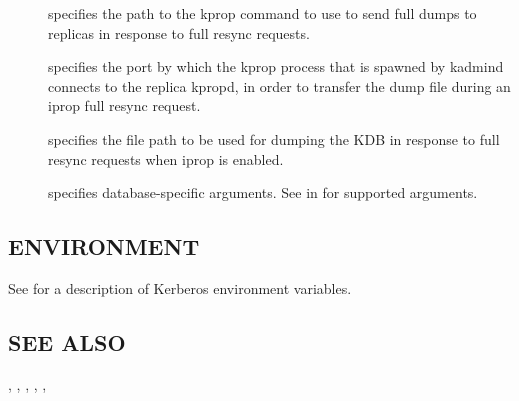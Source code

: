 \documentclass[letterpaper,10pt,english]{sphinxmanual}
\begin{document}
\begin{description}
\item[{ }] \leavevmode
specifies the path to the kprop command to use to send full dumps
to replicas in response to full resync requests.

\item[{ }] \leavevmode
specifies the port by which the kprop process that is spawned by
kadmind connects to the replica kpropd, in order to transfer the
dump file during an iprop full resync request.

\item[{ }] \leavevmode
specifies the file path to be used for dumping the KDB in response
to full resync requests when iprop is enabled.

\item[{ }] \leavevmode
specifies database-specific arguments.  See {\hyperref[\detokenize{admin/admin_commands/kadmin_local:dboptions}]{}} in {\hyperref[\detokenize{admin/admin_commands/kadmin_local:kadmin-1}]{}} for supported arguments.

\end{description}


\subsection{ENVIRONMENT}
\label{\detokenize{admin/admin_commands/kadmind:environment}}
See  for a description of Kerberos environment
variables.


\subsection{SEE ALSO}
\label{\detokenize{admin/admin_commands/kadmind:see-also}}
, {\hyperref[\detokenize{admin/admin_commands/kadmin_local:kadmin-1}]{}}, {\hyperref[\detokenize{admin/admin_commands/kdb5_util:kdb5-util-8}]{}},
{\hyperref[\detokenize{admin/admin_commands/kdb5_ldap_util:kdb5-ldap-util-8}]{}}, {\hyperref[\detokenize{admin/conf_files/kadm5_acl:kadm5-acl-5}]{}}, 
\end{document}
